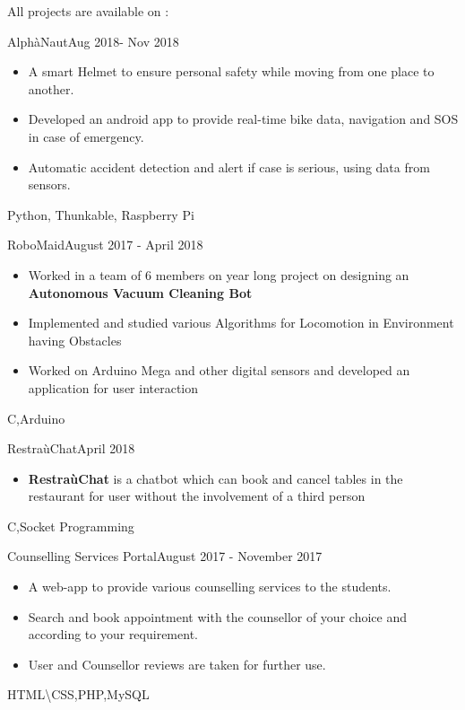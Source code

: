 
All projects are available on : 
\begin{projects}
	\project
	{AlphàNaut}{Aug 2018- Nov 2018}
	{}
	{
	    \begin{itemize}
	        \vspace{-5mm}
            \item A smart Helmet to ensure personal safety while moving from one place to another.
            \item Developed an android app to provide real-time bike data, navigation and SOS in case of emergency.
            \item Automatic accident detection and alert if case is serious, using data from sensors. 
        \end{itemize}
	}
	{Python, Thunkable, Raspberry Pi}
				
	\project
	{RoboMaid}{August 2017 - April 2018}
	{}
	{
	    \begin{itemize}
	        \vspace{-10mm}
            \item Worked in a team of 6 members on year long project on designing an \textbf{Autonomous Vacuum Cleaning Bot}
            \item Implemented and studied various Algorithms for Locomotion in Environment having Obstacles
            \item Worked on Arduino Mega and other digital sensors and developed an application for user interaction
        \end{itemize}
	}
	{C,Arduino}
	
	\project
	{RestraùChat}{April 2018}
	{}
	{
	    \begin{itemize}
	        \vspace{-5mm}
            \item {\textbf{RestraùChat} is a chatbot which can book and cancel tables in the restaurant for user without the involvement of a third person}
        \end{itemize}
	}
	{C,Socket Programming}
	
	\project
	{Counselling Services Portal}{August 2017 - November 2017}
	{}
	{
	    \begin{itemize}
	        \vspace{-5mm}
            \item {A web-app to provide various counselling services to the students.}
            \item {Search and book appointment with the counsellor of your choice and according to your requirement.}
            \item {User and Counsellor reviews are taken for further use.}
        \end{itemize}
	}
	{HTML\textbackslash CSS,PHP,MySQL}
    
\end{projects}